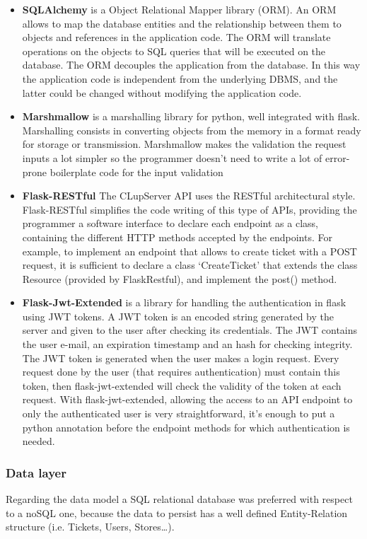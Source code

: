 \begin{itemize}
    \item \textbf{SQLAlchemy} is a Object Relational Mapper library (ORM). An ORM allows to map the database entities and the relationship between them to objects and references in the application code. The ORM will translate operations on the objects to SQL queries that will be executed on the database. The ORM decouples the application from the database. In this way the application code is independent from the underlying DBMS, and the latter could be changed without modifying the application code.
    \item \textbf{Marshmallow} is a marshalling library for python, well integrated with flask. Marshalling consists in converting objects from the memory in a format ready for storage or transmission. Marshmallow makes the validation the request inputs a lot simpler so the programmer doesn't need to write a lot of error-prone boilerplate code for the input validation
    \item \textbf{Flask-RESTful} The CLupServer API uses the RESTful architectural style. Flask-RESTful simplifies the code writing of this type of APIs, providing the programmer a software interface to declare each endpoint as a class, containing the different HTTP methods accepted by the endpoints. For example, to implement an endpoint that allows to create ticket with a POST request, it is sufficient to declare a class `CreateTicket' that extends the class Resource (provided by FlaskRestful), and implement the post() method.
    \item \textbf{Flask-Jwt-Extended} is a library for handling the authentication in flask using JWT tokens. A JWT token is an encoded string generated by the server and given to the user after checking its credentials. The JWT contains the user e-mail, an expiration timestamp and an hash for checking integrity. The JWT token is generated when the user makes a login request. Every request done by the user (that requires authentication) must contain this token, then flask-jwt-extended will check the validity of the token at each request. With flask-jwt-extended, allowing the access to an API endpoint to only the authenticated user is very straightforward, it's enough to put a python annotation before the endpoint methods for which authentication is needed.
\end{itemize}
\subsubsection{Data layer}
Regarding the data model a SQL relational database was preferred with respect to a noSQL one, because the data to persist has a well defined Entity-Relation structure (i.e. Tickets, Users, Stores\ldots).

